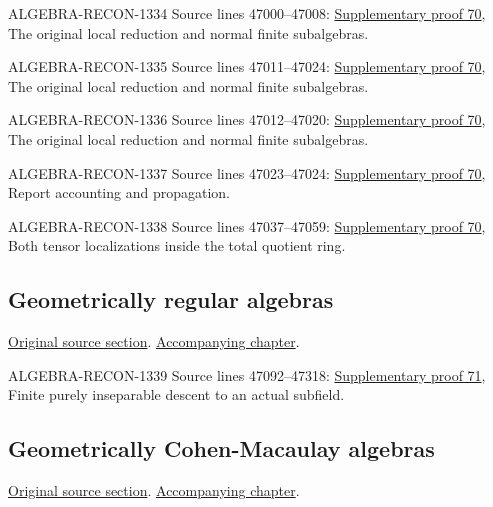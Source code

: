 \begin{AlgebraSourceRoutes}
\item[ALGEBRA-RECON-1334] Source lines 47000--47008: \hyperlink{algebra_geonormal_notes_20260929}{Supplementary proof 70}, The original local reduction and normal finite subalgebras.
\item[ALGEBRA-RECON-1335] Source lines 47011--47024: \hyperlink{algebra_geonormal_notes_20260929}{Supplementary proof 70}, The original local reduction and normal finite subalgebras.
\item[ALGEBRA-RECON-1336] Source lines 47012--47020: \hyperlink{algebra_geonormal_notes_20260929}{Supplementary proof 70}, The original local reduction and normal finite subalgebras.
\item[ALGEBRA-RECON-1337] Source lines 47023--47024: \hyperlink{algebra_geonormal_notes_20260929}{Supplementary proof 70}, Report accounting and propagation.
\item[ALGEBRA-RECON-1338] Source lines 47037--47059: \hyperlink{algebra_geonormal_notes_20260929}{Supplementary proof 70}, Both tensor localizations inside the total quotient ring.
\end{AlgebraSourceRoutes}

\subsection{Geometrically regular algebras}
\hypertarget{algebra-source-section-geometrically-regular}{}
\noindent\href{https://github.com/stacks/stacks-project/blob/a04446e57ec1fbc252a871afcec7752fb2807b14/algebra.tex\#L47092}{Original source section}. \href{algebra.pdf\#nameddest=section-geometrically-regular}{Accompanying chapter}.

\begin{AlgebraSourceRoutes}
\item[ALGEBRA-RECON-1339] Source lines 47092--47318: \hyperlink{algebra_georeg_cm_notes_20260929}{Supplementary proof 71}, Finite purely inseparable descent to an actual subfield.
\end{AlgebraSourceRoutes}

\subsection{Geometrically Cohen-Macaulay algebras}
\hypertarget{algebra-source-section-geometrically-CM}{}
\noindent\href{https://github.com/stacks/stacks-project/blob/a04446e57ec1fbc252a871afcec7752fb2807b14/algebra.tex\#L47255}{Original source section}. \href{algebra.pdf\#nameddest=section-geometrically-CM}{Accompanying chapter}.

